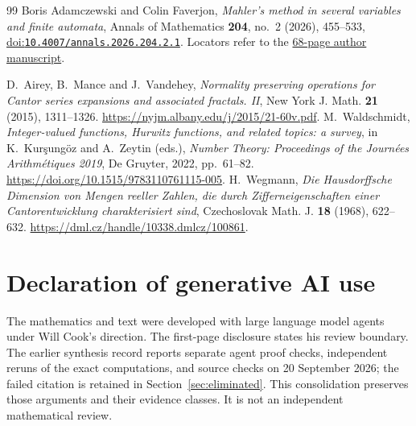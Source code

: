 \documentclass[11pt]{article}
\begin{document}
\begin{thebibliography}{99}
 Boris Adamczewski and Colin Faverjon,
  \emph{Mahler's method in several variables and finite automata},
  Annals of Mathematics \textbf{204}, no.~2 (2026), 455--533,
  \href{https://doi.org/10.4007/annals.2026.204.2.1}{doi:\nolinkurl{10.4007/annals.2026.204.2.1}}.
  Locators refer to the
  \href{https://faverjon.perso.math.cnrs.fr/AdamczewskiFaverjon_MahlerFiniteAutomata.pdf}{68-page author manuscript}.

 D.~Airey, B.~Mance and J.~Vandehey,
\emph{Normality preserving operations for Cantor series expansions and
associated fractals. II}, New York J. Math. \textbf{21} (2015), 1311--1326.
\url{https://nyjm.albany.edu/j/2015/21-60v.pdf}.
 M.~Waldschmidt,
\emph{Integer-valued functions, Hurwitz functions, and related topics: a survey},
in K.~Kur\c{s}ung\"oz and A.~Zeytin (eds.), \emph{Number Theory: Proceedings
of the Journ\'ees Arithm\'etiques 2019}, De Gruyter, 2022, pp.~61--82.
\url{https://doi.org/10.1515/9783110761115-005}.
 H.~Wegmann,
\emph{Die Hausdorffsche Dimension von Mengen reeller Zahlen, die durch
Zifferneigenschaften einer Cantorentwicklung charakterisiert sind},
Czechoslovak Math. J. \textbf{18} (1968), 622--632.
\url{https://dml.cz/handle/10338.dmlcz/100861}.
\end{thebibliography}

\section*{Declaration of generative AI use}
The mathematics and text were developed with large language model agents
under Will Cook's direction. The first-page disclosure states his review
boundary. The earlier synthesis record reports separate agent proof checks,
independent reruns of the exact computations, and source checks on 20 September
2026; the failed citation is retained in Section~\ref{sec:eliminated}.
This consolidation preserves those arguments and their evidence classes.
It is not an independent mathematical review.
\end{document}
